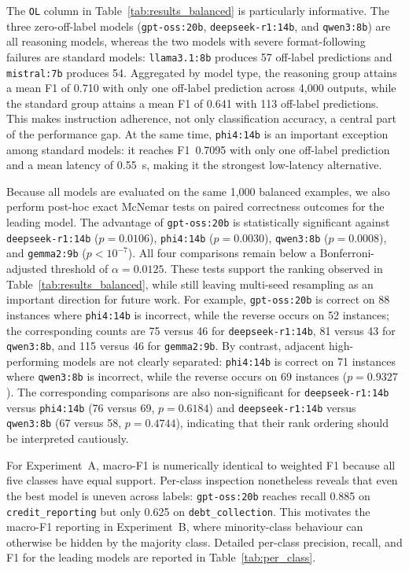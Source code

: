 \documentclass[journal]{IEEEtran}
\begin{document}
The \texttt{OL} column in Table~\ref{tab:results_balanced} is
particularly informative. The three zero-off-label models
(\texttt{gpt-oss:20b}, \texttt{deepseek-r1:14b}, and
\texttt{qwen3:8b}) are all reasoning models, whereas the two models
with severe format-following failures are standard models:
\texttt{llama3.1:8b} produces 57 off-label predictions and
\texttt{mistral:7b} produces 54. Aggregated by model type, the
reasoning group attains a mean F1 of 0.710 with only one off-label
prediction across 4,000 outputs, while the standard group attains a
mean F1 of 0.641 with 113 off-label predictions. This makes
instruction adherence, not only classification accuracy, a central
part of the performance gap. At the same time, \texttt{phi4:14b}
is an important exception among standard models: it reaches F1~0.7095
with only one off-label prediction and a mean latency of 0.55~s,
making it the strongest low-latency alternative.

Because all models are evaluated on the same 1,000 balanced examples,
we also perform post-hoc exact McNemar tests on paired correctness
outcomes for the leading model. The advantage of
\texttt{gpt-oss:20b} is statistically significant against
\texttt{deepseek-r1:14b} ($p=0.0106$), \texttt{phi4:14b}
($p=0.0030$), \texttt{qwen3:8b} ($p=0.0008$), and
\texttt{gemma2:9b} ($p<10^{-7}$). All four comparisons remain below
a Bonferroni-adjusted threshold of $\alpha=0.0125$. These tests
support the ranking observed in Table~\ref{tab:results_balanced},
while still leaving multi-seed resampling as an important direction
for future work.
For example, \texttt{gpt-oss:20b} is correct on 88 instances where
\texttt{phi4:14b} is incorrect, while the reverse occurs on 52
instances; the corresponding counts are 75 versus 46 for
\texttt{deepseek-r1:14b}, 81 versus 43 for \texttt{qwen3:8b}, and
115 versus 46 for \texttt{gemma2:9b}.
By contrast, adjacent high-performing models are not clearly
separated: \texttt{phi4:14b} is correct on 71 instances where
\texttt{qwen3:8b} is incorrect, while the reverse occurs on 69
instances ($p=0.9327$). The corresponding comparisons are also
non-significant for \texttt{deepseek-r1:14b} versus \texttt{phi4:14b}
(76 versus 69, $p=0.6184$) and \texttt{deepseek-r1:14b} versus
\texttt{qwen3:8b} (67 versus 58, $p=0.4744$), indicating that their
rank ordering should be interpreted cautiously.

For Experiment~A, macro-F1 is numerically identical to weighted F1
because all five classes have equal support. Per-class inspection
nonetheless reveals that even the best model is uneven across labels:
\texttt{gpt-oss:20b} reaches recall 0.885 on
\texttt{credit\_reporting} but only 0.625 on
\texttt{debt\_collection}. This motivates the macro-F1 reporting in
Experiment~B, where minority-class behaviour can otherwise be hidden
by the majority class. Detailed per-class precision, recall, and F1
for the leading models are reported in Table~\ref{tab:per_class}.
\end{document}
